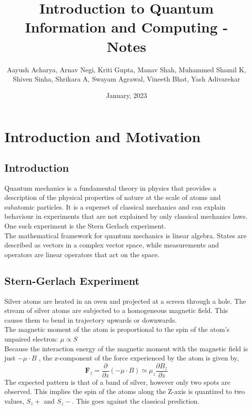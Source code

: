 \documentclass{article}
\title{Introduction to Quantum Information and Computing - Notes}
\author{Aayush Acharya, Arnav Negi, Kriti Gupta, Manav Shah, Muhammed Shamil K,\\ Shiven Sinha, Shrikara A, Swayam Agrawal, Vineeth Bhat, Yash Adivarekar} %
\date{January, 2023}
\begin{document}
\maketitle
\vfill
\tableofcontents
\newpage
{}


\section{Introduction and Motivation}
\subsection{Introduction}

Quantum mechanics is a fundamental theory in physics that provides a description of the physical properties of nature at the scale of atoms and subatomic particles. It is a superset of classical mechanics and can explain
behaviour in experiments that are not explained by only classical mechanics laws. One such experiment is
the Stern Gerlach experiment.\\

The mathematical framework for quantum mechanics is linear algebra. States are described as vectors in a complex
vector space, while measurements and operators are linear operators that act on the space.\\


\subsection{Stern-Gerlach Experiment}

Silver atoms are heated in an oven and projected at a screen through a hole. The stream of silver atoms
are subjected to a homogeneous magnetic field. This causes them to bend in trajectory upwards or downwards.\\

The magnetic moment of the atom is proportional to the spin of the atom's unpaired electron: $\mu \propto S$\\

Because the interaction energy of the magnetic moment with the magnetic field
is just $-\mu \cdot B$ , the z-component of the force experienced by the atom is given by,
$$\textbf{F}_z = \frac{\partial}{\partial z}(-\mu \cdot B) \simeq \mu_z\frac{\partial B_z}{\partial z}$$
The expected pattern is that of a band of silver, however only two spots are observed. This implies
the spin of the atoms along the Z-axis is quantized to two values, $S_z+$ and $S_z-$. This goes against the classical prediction.
\end{document}
